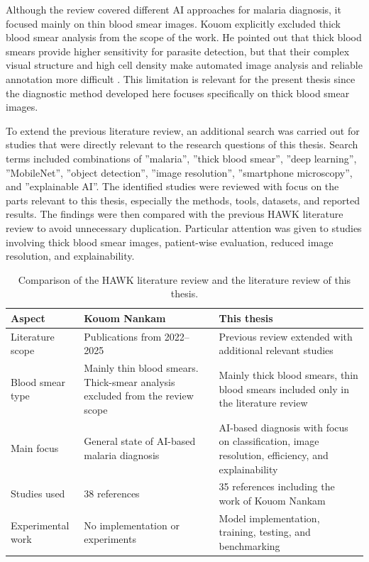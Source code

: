 Although the review covered different AI approaches for malaria diagnosis, it focused mainly on thin blood smear images. Kouom explicitly excluded thick blood smear analysis from the scope of the work. He pointed out that thick blood smears provide higher sensitivity for parasite detection, but that their complex visual structure and high cell density make automated image analysis and reliable annotation more difficult \cite{Kouom2026}. This limitation is relevant for the present thesis since the diagnostic method developed here focuses specifically on thick blood smear images.

To extend the previous literature review, an additional search was carried out for studies that were directly relevant to the research questions of this thesis. Search terms included combinations of ''malaria'', ''thick blood smear'', ''deep learning'', ''MobileNet'', ''object detection'', ''image resolution'', ''smartphone microscopy'', and ''explainable AI''. The identified studies were reviewed with focus on the parts relevant to this thesis, especially the methods, tools, datasets, and reported results. The findings were then compared with the previous HAWK literature review to avoid unnecessary duplication. Particular attention was given to studies involving thick blood smear images, patient-wise evaluation, reduced image resolution, and explainability.

\begin{table}[htbp]
    \centering
    \caption{Comparison of the HAWK literature review and the literature review of this thesis.}
    \label{tab:literature_review_comparison}
    \begin{tabularx}{\textwidth}{|p{3.2cm}|X|X|}
        \hline
        \textbf{Aspect} & \textbf{Kouom Nankam} & \textbf{This thesis} \\
        \hline
        Literature scope & Publications from 2022--2025 & Previous review extended with additional relevant studies \\
        \hline
        Blood smear type & Mainly thin blood smears. Thick-smear analysis excluded from the review scope & Mainly thick blood smears, thin blood smears included only in the literature review \\
        \hline
        Main focus & General state of AI-based malaria diagnosis & AI-based diagnosis with focus on classification, image resolution, efficiency, and explainability \\
        \hline
        Studies used & 38 references & 35 references including the work of Kouom Nankam\\
        \hline
        Experimental work & No implementation or experiments & Model implementation, training, testing, and benchmarking \\
        \hline
    \end{tabularx}
\end{table}

